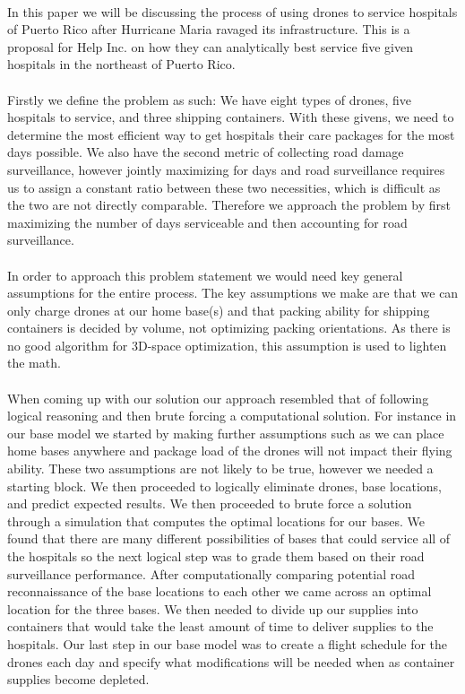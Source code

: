 \paragraph{} In this paper we will be discussing the process of using drones to service hospitals of Puerto Rico after Hurricane Maria ravaged its infrastructure. This is a proposal for Help Inc. on how they can analytically best service five given hospitals in the northeast of Puerto Rico.
\paragraph{} Firstly we define the problem as such: We have eight types of drones, five hospitals to service, and three shipping containers. With these givens, we need to determine the most efficient way to get hospitals their care packages for the most days possible. We also have the second metric of collecting road damage surveillance, however jointly maximizing for days and road surveillance requires us to assign a constant ratio between these two necessities, which is difficult as the two are not directly comparable. Therefore we approach the problem by first maximizing the number of days serviceable and then accounting for road surveillance.
\paragraph{} In order to approach this problem statement we would need key general assumptions for the entire process. The key assumptions we make are that we can only charge drones at our home base(s) and that packing ability for shipping containers is decided by volume, not optimizing packing orientations. As there is no good algorithm for 3D-space optimization, this assumption is used to lighten the math.
\paragraph{} When coming up with our solution our approach resembled that of following logical reasoning and then brute forcing a computational solution. For instance in our base model we started by making further assumptions such as we can place home bases anywhere and package load of the drones will not impact their flying ability. These two assumptions are not likely to be true, however we needed a starting block. We then proceeded to logically eliminate drones, base locations, and predict expected results. We then proceeded to brute force a solution through a simulation that computes the optimal locations for our bases. We found that there are many different possibilities of bases that could service all of the hospitals so the next logical step was to grade them based on their road surveillance performance. After computationally comparing potential road reconnaissance of the base locations to each other we came across an optimal location for the three bases. We then needed to divide up our supplies into containers that would take the least amount of time to deliver supplies to the hospitals. Our last step in our base model was to create a flight schedule for the drones each day and specify what modifications will be needed when as container supplies become depleted.
